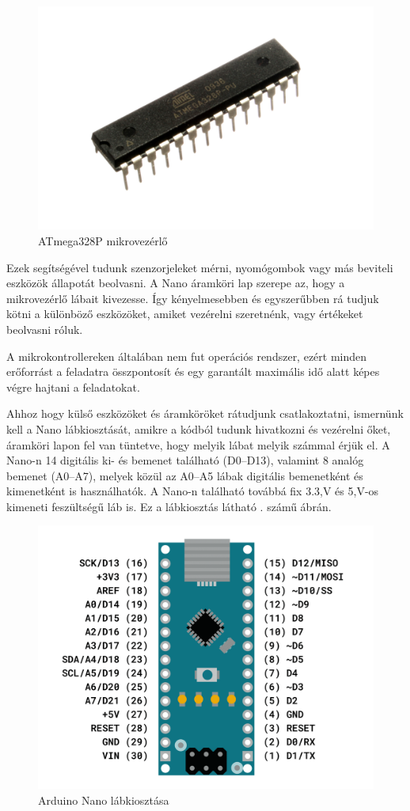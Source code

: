 \documentclass[]{thesis-ekf}
\theoremstyle{definition}
\theoremstyle{remark}
\begin{document}
\begin{figure}[th!]
	\centering
	\includegraphics[width=0.4\linewidth]{ATMEGA328P-PU}
	\caption[ATmega328P]{ATmega328P mikrovezérlő}
	\label{fig:atmega328p-pu}
\end{figure}

Ezek segítségével tudunk szenzorjeleket mérni, nyomógombok vagy más beviteli eszközök állapotát beolvasni. A Nano áramköri lap szerepe az, hogy a mikrovezérlő lábait kivezesse. Így kényelmesebben és egyszerűbben rá tudjuk kötni a különböző eszközöket, amiket vezérelni szeretnénk, vagy értékeket beolvasni róluk. 

A mikrokontrollereken általában nem fut operációs rendszer, ezért minden erőforrást a feladatra összpontosít és egy garantált maximális idő alatt képes végre hajtani a feladatokat. 

Ahhoz hogy külső eszközöket és áramköröket rátudjunk csatlakoztatni, ismernünk kell a Nano lábkiosztását, amikre a kódból tudunk hivatkozni és vezérelni őket, áramköri lapon fel van tüntetve, hogy melyik lábat melyik számmal érjük el.  A Nano-n 14 digitális ki- és bemenet található (D0–D13), valamint 8 analóg bemenet (A0–A7), melyek közül az A0–A5 lábak digitális bemenetként és kimenetként is használhatók. A Nano-n található továbbá fix 3.3,V és 5,V-os kimeneti feszültségű láb is. Ez a lábkiosztás látható . számű ábrán.

\begin{figure}[th!]
	\centering
	\includegraphics[width=0.7\linewidth]{arduino-nano-pinout}
	\caption[Nano felépítés]{Arduino Nano lábkiosztása}
	\label{fig:arduino-nano-pinout}
\end{figure}
\end{document}
